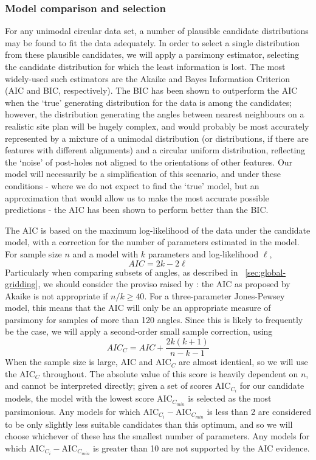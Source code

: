 \documentclass[../../ArchStats.tex]{subfiles}
\begin{document}
\subsubsection{Model comparison and selection}
\label{sec:AIC}

For any unimodal circular data set, a number of plausible candidate distributions may be found to fit the data adequately. In order to select a single distribution from these plausible candidates, we will apply a parsimony estimator, selecting the candidate distribution for which the least information is lost. The most widely-used such estimators are the Akaike and Bayes Information Criterion (AIC and BIC, respectively). The BIC has been shown to outperform the AIC when the `true' generating distribution for the data is among the candidates\cite{aho2014}; however, the distribution generating the angles between nearest neighbours on a realistic site plan will be hugely complex, and would probably be most accurately represented by a mixture of a unimodal distribution (or distributions, if there are features with different alignments) and a circular uniform distribution, reflecting the `noise'  of post-holes not aligned to the orientations of other features. Our model will necessarily be a simplification of this scenario, and under these conditions - where we do not expect to find the `true' model, but an approximation that would allow us to make the most accurate possible predictions - the AIC has been shown to perform better than the BIC.

The AIC is based on the maximum log-likelihood of the data under the candidate model, with a correction for the number of parameters estimated in the model\cite{Akaike1974}. For sample size $n$ and a model with $k$ parameters and log-likelihood $\ell$, 
\begin{equation}
AIC = 2k - 2 \ell
\end{equation}
Particularly when comparing subsets of angles, as described in ~\ref{sec:global-gridding}, we should consider the proviso raised by \cite{Burnham2004}: the AIC as proposed by Akaike  is not appropriate if $n/k \geq 40$. For a three-parameter Jones-Pewsey model, this means that the AIC will only be an appropriate measure of parsimony for samples of more than 120 angles. Since this is likely to frequently be the case, we will apply a second-order small sample correction, using
\begin{equation}
AIC_C = AIC + \frac{2k(k+1)}{n-k-1}
\end{equation}
When the sample size is large, AIC and AIC$_C$ are almost identical, so we will use the AIC$_C$ throughout. The absolute value of this score is heavily dependent on $n$, and cannot be interpreted directly; given a set of scores AIC$_{C_i}$ for our candidate models, the model with the lowest score AIC$_{C_{min}}$ is selected as the most parsimonious. Any models for which AIC$_{C_i} - $AIC$_{C_{min}}$ is less than 2 are considered to be only slightly less suitable candidates than this optimum, and so we will choose whichever of these has the smallest number of parameters. Any models for which AIC$_{C_i} - $AIC$_{C_{min}}$ is greater than 10 are not supported by the AIC evidence.
\end{document}
